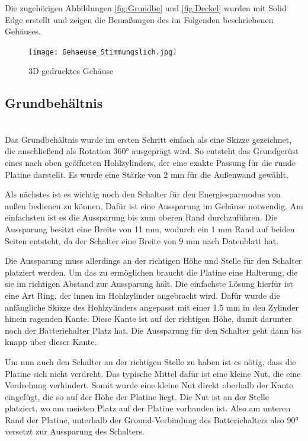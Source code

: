 \documentclass[a4paper,
DIV=13,
12pt,
BCOR=10mm,
department=FakEI,
parskip=half,
automark,
]{article}
\begin{document}
Die zugehörigen Abbildungen \ref{fig:Grundbe} und \ref{fig:Deckel} wurden mit Solid Edge erstellt und zeigen die Bemaßungen des im Folgenden beschriebenen Gehäuses.

\begin{figure}[!hbpt]
 \begin{center} \texttt{[image: Gehaeuse\_Stimmungslich.jpg]}
 \caption{3D gedrucktes Gehäuse}
 \label{fig:Register}
  \end{center}
\end{figure}

\subsection{Grundbehältnis} $~$ \\
Das Grundbehältnis wurde im ersten Schritt einfach als eine Skizze gezeichnet, die anschließend als Rotation 360° ausgeprägt wird. So entsteht das Grundgerüst eines nach oben geöffneten Hohlzylinders, der eine exakte Passung für die runde Platine darstellt. Es wurde eine Stärke von 2 mm für die Außenwand gewählt. 

Als nächstes ist es wichtig noch den Schalter für den Energiesparmodus von außen bedienen zu können. Dafür ist eine Aussparung im Gehäuse notwendig. Am einfachsten ist es die Aussparung bis zum oberen Rand durchzuführen. Die Aussparung besitzt eine Breite von 11 mm, wodurch ein 1 mm Rand auf beiden Seiten entsteht, da der Schalter eine Breite von 9 mm nach Datenblatt hat. 

Die Aussparung muss allerdings an der richtigen Höhe und Stelle für den Schalter platziert werden. Um das zu ermöglichen braucht die Platine eine Halterung, die sie im richtigen Abstand zur Aussparung hält. Die einfachste Lösung hierfür ist eine Art Ring, der innen im Hohlzylinder angebracht wird. Dafür wurde die anfängliche Skizze des Hohlzylinders angepasst mit einer 1.5 mm in den Zylinder hinein ragenden Kante. Diese Kante ist auf der richtigen Höhe, damit darunter noch der Batteriehalter Platz hat. Die Aussparung für den Schalter geht dann bis knapp über dieser Kante.

Um nun auch den Schalter an der richtigen Stelle zu haben ist es nötig, dass die Platine sich nicht verdreht. Das typische Mittel dafür ist eine kleine Nut, die eine Verdrehung verhindert. Somit wurde eine kleine Nut direkt oberhalb der Kante eingefügt, die so auf der Höhe der Platine liegt. Die Nut ist an der Stelle platziert, wo am meisten Platz auf der Platine vorhanden ist. Also am unteren Rand der Platine, unterhalb der Ground-Verbindung des Batteriehalters also 90° versetzt zur Aussparung des Schalters. 
\end{document}
